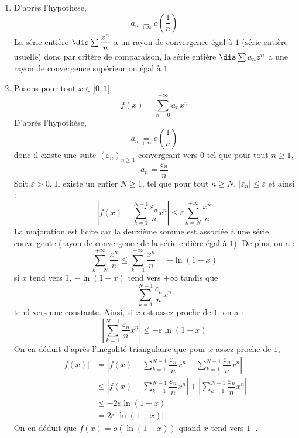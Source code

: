 \documentclass[a4paper,10pt]{report}
\begin{document}
\begin{corr} 
\begin{enumerate}
\item D'après l'hypothèse,
$$ a_n \underset{+ \infty}{=} o \left(\dfrac{1}{n}\right)$$
La série entière $\dis \sum \dfrac{z^n}{n}$ a un rayon de convergence égal à $1$ (série entière usuelle) donc par critère de comparaison, la série entière $\dis \sum a_n z^n$ a une rayon de convergence supérieur ou égal à $1$.
\item Posons pour tout $x \in ]0,1[$,
$$ f(x) = \sum_{n=0}^{+ \infty} a_n x^n$$
D'après l'hypothèse, 
$$ a_n \underset{+ \infty}{=} o \left(\dfrac{1}{n}\right)$$
donc il existe une suite $(\varepsilon_n)_{n \geq 1}$ convergeant vers $0$ tel que pour tout $n \geq 1$,
$$ a_n = \dfrac{\varepsilon_n}{n}$$
Soit $\varepsilon>0$. Il existe un entier $N \geq 1$, tel que pour tout $n \geq N$, $\vert \varepsilon_n \vert \leq \varepsilon$ et ainsi :
$$ \left\vert f(x) - \sum_{k=1}^{N-1}  \dfrac{\varepsilon_n}{n}x^n \right\vert \leq \varepsilon \sum_{k=N}^{+ \infty} \dfrac{x^n}{n}$$
La majoration est licite car la deuxième somme est associée à une série convergente (rayon de convergence de la série entière égal à $1$). De plus, on a :
$$ \sum_{k=N}^{+ \infty} \dfrac{x^n}{n} \leq \sum_{k=1}^{+ \infty} \dfrac{x^n}{n} =  -\ln(1-x)$$
si $x$ tend vers $1$, $-\ln(1-x)$ tend vers $+ \infty$ tandis que 
$$ \sum_{k=1}^{N-1} \dfrac{\varepsilon_n}{n}x^n$$
tend vers une constante. Ainsi, si $x$ est assez proche de $1$, on a :
$$ \left\vert \sum_{k=1}^{N-1}  \dfrac{\varepsilon_n}{n} x^n \right\vert \leq -\varepsilon \ln(1-x)$$
On en déduit d'après l'inégalité triangulaire que pour $x$ assez proche de $1$,
\begin{align*}
\vert f(x) \vert & =  \left\vert f(x) - \sum_{k=1}^{N-1} \dfrac{\varepsilon_n}{n} x^n +  \sum_{k=1}^{N-1}  \dfrac{\varepsilon_n}{n} x^n \right\vert \\
& \leq  \left\vert f(x) - \sum_{k=1}^{N-1} \dfrac{\varepsilon_n}{n}x^n \right\vert +  \left\vert\sum_{k=1}^{N-1}  \dfrac{\varepsilon_n}{n}x^n\right\vert \\
& \leq -2 \varepsilon \ln(1-x) \\
& = 2 \varepsilon \vert \ln(1-x) \vert
\end{align*}
On en déduit que $f(x)= o(\ln(1-x))$ quand $x$ tend vers $1^{-}$.
\end{enumerate}
\end{corr}
\end{document}
